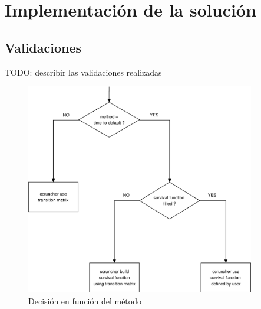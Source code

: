 
%
%
%
%
%
%
%
%

\chapter{Implementaci\'on de la soluci\'on}
\label{sec:implementation}

\section{Validaciones}

TODO: describir las validaciones realizadas


\begin{figure}[!hb]
\begin{center}
\includegraphics[width=10cm,angle=0]{./images/decisiontree1.eps}
\caption{Decisi\'on en funci\'on del m\'etodo}
\label{functionsIJ}
\end{center}
\end{figure}


